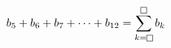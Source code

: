 $b_5+b_6+b_7+\cdots+b_{12}=\displaystyle\sum_{k=\text{\setlength{\fboxsep}{0.8pt}\framebox[5.6pt]{\rule{0pt}{3.2pt}}}}^{\text{\setlength{\fboxsep}{0.8pt}\framebox[5.6pt]{\rule{0pt}{3.2pt}}}} b_k$
